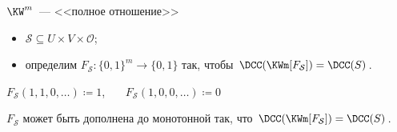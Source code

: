 \begin{frame}{$\KW^m$~--- <<полное отношение>>}

    \begin{itemize}
        \item $\mathcal{S} \subseteq U \times V \times \mathcal{O}$;
        \item определим $F_{\mathcal{S}}\colon \{0, 1\}^m \to \{0, 1\}$ так, чтобы
            $\DCC(\KWm[F_{\mathcal{S}}]) = \DCC(S)$.
    \end{itemize}

    \pause

    \vspace{-0.2cm}
    \begin{center}
        
    \end{center}

    \pause
    $F_{\mathcal{S}}(1, 1, 0, \dots) \coloneqq 1$\pause, ~~~$F_{\mathcal{S}}(1, 0, 0, \dots) \coloneqq 0$

    \pause
    \begin{lemma}
        $F_{\mathcal{S}}$ может быть дополнена до монотонной так, что $\DCC(\KWm[F_{\mathcal{S}}]) =
        \DCC(S)$.
    \end{lemma}

    \pause

\end{frame}